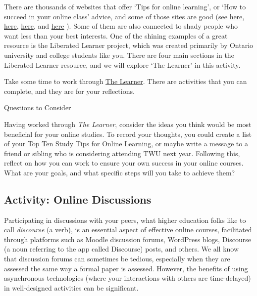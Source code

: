\documentclass[
]{book}
\theoremstyle{definition}
\theoremstyle{definition}
\theoremstyle{definition}
\theoremstyle{definition}
\theoremstyle{remark}
\begin{document}
\begin{reflect}
There are thousands of websites that offer `Tips for online learning', or `How to succeed in your online class' advice, and some of those sites are good (see \href{https://www.purdueglobal.edu/blog/online-learning/online-learning-self-motivation/}{here}, \href{https://www.ualberta.ca/current-students/academic-success-centre/resources/working-online.html}{here}, \href{https://online.umn.edu/story/15-tips-succeed-online-class}{here}, and \href{https://www.trentu.ca/online/student-support/be-a-successful-online-learner}{here} ). Some of them are also connected to shady people who want less than your best interests. One of the shining examples of a great resource is the Liberated Learner project, which was created primarily by Ontario university and college students like you. There are four main sections in the Liberated Learner resource, and we will explore `The Learner' in this activity.

Take some time to work through \href{https://ecampusontario.pressbooks.pub/learner/part/learner/}{The Learner}. There are activities that you can complete, and they are for your reflections.

{Questions to Consider}

Having worked through \emph{The Learner}, consider the ideas you think would be most beneficial for your online studies. To record your thoughts, you could create a list of your Top Ten Study Tips for Online Learning, or maybe write a message to a friend or sibling who is considering attending TWU next year. Following this, reflect on how you can work to ensure your own success in your online courses. What are your goals, and what specific steps will you take to achieve them?
\end{reflect}

\hypertarget{activity-online-discussions}{%
\subsection*{Activity: Online Discussions}\label{activity-online-discussions}}

Participating in discussions with your peers, what higher education folks like to call \emph{discourse} (a verb), is an essential aspect of effective online courses, facilitated through platforms such as Moodle discussion forums, WordPress blogs, Discourse (a noun referring to the app called Discourse) posts, and others. We all know that discussion forums can sometimes be tedious, especially when they are assessed the same way a formal paper is assessed. However, the benefits of using asynchronous technologies (where your interactions with others are time-delayed) in well-designed activities can be significant.
\end{document}
